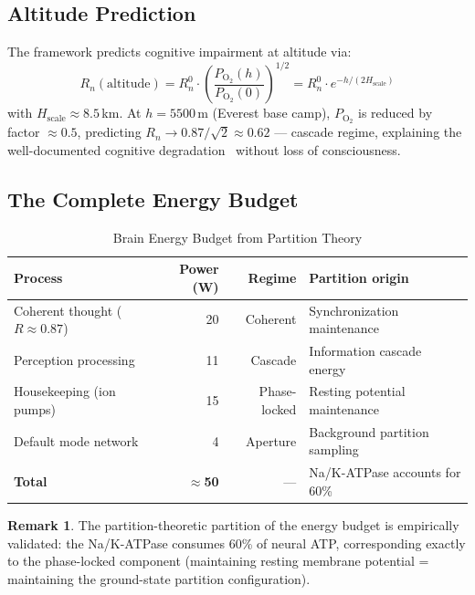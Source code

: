 \documentclass[10pt,twocolumn,a4paper]{article}
\theoremstyle{definition}
\newtheorem{remark}{Remark}
\begin{document}
\subsection{Altitude Prediction}

The framework predicts cognitive impairment at altitude via:
\begin{equation}
R_n(\text{altitude}) = R_n^0 \cdot \left(\frac{P_{\text{O}_2}(h)}{P_{\text{O}_2}(0)}\right)^{1/2}
= R_n^0 \cdot e^{-h/(2H_{\text{scale}})}
\end{equation}
with $H_{\text{scale}} \approx 8.5$\,km. At $h = 5500$\,m (Everest base camp),
$P_{\text{O}_2}$ is reduced by factor $\approx 0.5$, predicting $R_n \to 0.87/\sqrt{2} \approx 0.62$
--- cascade regime, explaining the well-documented cognitive degradation~\cite{wilson2009cognitive,hornbein1989altitude,grocott2009arterial} without
loss of consciousness.

\subsection{The Complete Energy Budget}

\begin{table}[H]
\centering
\caption{Brain Energy Budget from Partition Theory}
\label{tab:energy}
\begin{tabular}{lrrl}
\toprule
\textbf{Process} & \textbf{Power (W)} & \textbf{Regime} & \textbf{Partition origin}\\
\midrule
Coherent thought ($R \approx 0.87$) & 20 & Coherent & Synchronization maintenance\\
Perception processing & 11 & Cascade & Information cascade energy\\
Housekeeping (ion pumps) & 15 & Phase-locked & Resting potential maintenance\\
Default mode network & 4 & Aperture & Background partition sampling\\
\midrule
\textbf{Total} & \textbf{$\approx$50} & --- & Na/K-ATPase accounts for 60\%~\cite{lennie2003cost}\\
\bottomrule
\end{tabular}
\end{table}

\begin{remark}
The partition-theoretic partition of the energy budget is empirically validated:
the Na/K-ATPase consumes 60\% of neural ATP, corresponding exactly to the
phase-locked component (maintaining resting membrane potential = maintaining
the ground-state partition configuration).
\end{remark}
\end{document}
